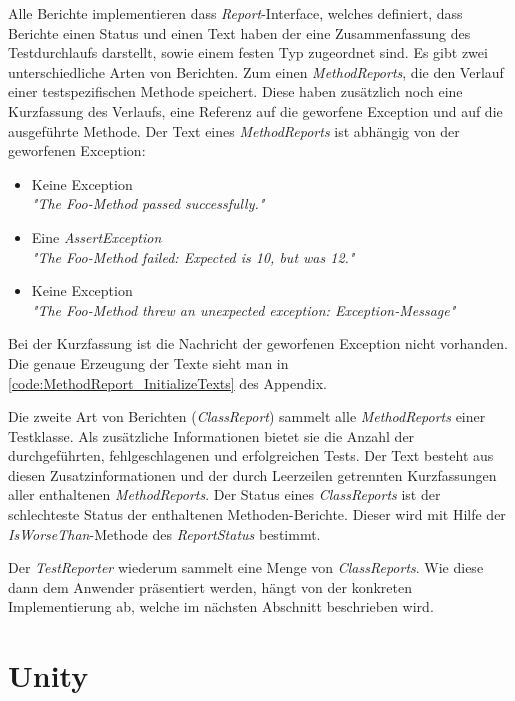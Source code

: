Alle Berichte implementieren dass \textit{Report}-Interface, welches definiert, dass Berichte einen Status und einen Text haben der eine Zusammenfassung des Testdurchlaufs darstellt, sowie einem festen Typ zugeordnet sind. Es gibt zwei unterschiedliche Arten von Berichten. Zum einen \textit{MethodReports}, die den Verlauf einer testspezifischen Methode speichert. Diese haben zusätzlich noch eine Kurzfassung des Verlaufs, eine Referenz auf die geworfene Exception und auf die ausgeführte Methode. Der Text eines \textit{MethodReports} ist abhängig von der geworfenen Exception:
\begin{itemize}
\item Keine Exception\\
\textit{"The Foo-Method passed successfully."}
\item Eine \textit{AssertException}\\
\textit{"The Foo-Method failed: Expected is 10, but was 12."}
\item Keine Exception\\
\textit{"The Foo-Method threw an unexpected exception: Exception-Message"}
\end{itemize}
Bei der Kurzfassung ist die Nachricht der geworfenen Exception nicht vorhanden. Die genaue Erzeugung der Texte sieht man in \autoref{code:MethodReport_InitializeTexts}  des Appendix.

Die zweite Art von Berichten (\textit{ClassReport}) sammelt alle \textit{MethodReports} einer Testklasse. Als zusätzliche Informationen bietet sie die Anzahl der durchgeführten, fehlgeschlagenen und erfolgreichen Tests. Der Text besteht aus diesen Zusatzinformationen und der durch Leerzeilen getrennten Kurzfassungen aller enthaltenen \textit{MethodReports}. Der Status eines \textit{ClassReports} ist der schlechteste Status der enthaltenen Methoden-Berichte. Dieser wird mit Hilfe der \textit{IsWorseThan}-Methode des \textit{ReportStatus}  bestimmt.

Der \textit{TestReporter} wiederum sammelt eine Menge von \textit{ClassReports}. Wie diese dann dem Anwender präsentiert werden, hängt von der konkreten Implementierung ab, welche im nächsten Abschnitt beschrieben wird.

\section{Unity}
\label{sec:Ergebnis_Unity}

